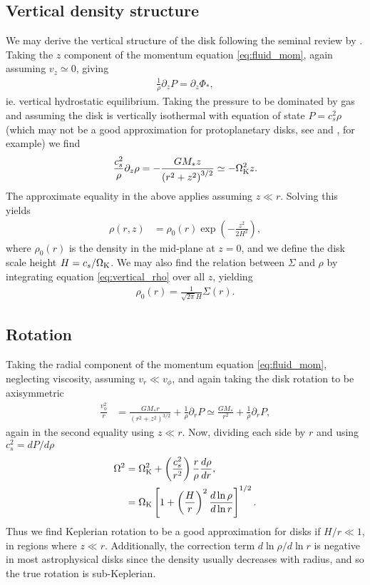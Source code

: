 \subsection{Vertical density structure}

We may derive the vertical structure of the disk following the seminal review by \citet{pringle1981}. Taking the $z$ component of the momentum equation \ref{eq:fluid_mom}, again assuming $v_z \simeq 0$, giving
\begin{align}
    \frac{1}{\rho} \partial_z P = \partial_z \Phi_*,
\end{align}
ie. vertical hydrostatic equilibrium. 
Taking the pressure to be dominated by gas and assuming the disk is vertically isothermal with equation of state $P=c_s^2 \rho$ (which may not be a good approximation for protoplanetary disks, see \citet{pinte2018} and \citet{calahan2021}, for example) we find
\begin{align}
    \frac{c_s^2}{\rho} \partial_z \rho = - \frac{G M_* z}{\left(r^2 + z^2\right)^{3/2}} \simeq - \Omega_{\rm K}^2 z.
\end{align}
The approximate equality in the above applies assuming $z \ll r$. 
Solving this yields
\begin{align}
    \rho(r,z) &= \rho_0(r) \exp{\left( -\frac{z^2}{2 H^2} \right)}, \label{eq:vertical_rho}
\end{align}
where $\rho_0(r)$ is the density in the mid-plane at $z=0$, and we define the disk scale height $H = c_s/\Omega_{\rm K}$.
We may also find the relation between $\Sigma$ and $\rho$ by integrating equation \ref{eq:vertical_rho} over all $z$, yielding
\begin{align}
    \rho_0(r) = \frac{1}{\sqrt{2\pi} H} \Sigma(r).
\end{align}

\subsection{Rotation}

Taking the radial component of the momentum equation \ref{eq:fluid_mom}, neglecting viscosity, assuming $v_r \ll v_\phi$, and again taking the disk rotation to be axisymmetric
\begin{align}
    \frac{v_\phi^2}{r} &= \frac{G M_* r}{\left( r^2 + z^2  \right)^{3/2}} + \frac{1}{\rho} \partial_r P \simeq \frac{G M_*}{ r^2} + \frac{1}{\rho} \partial_r P, 
\end{align}
again in the second equality using $z \ll r$. Now, dividing each side by $r$ and using $c_s^2=dP/d\rho$
\begin{align}
    \Omega^2 &= \Omega_{\rm K}^2 + \left( \frac{c_s^2}{r^2} \right) \frac{r}{\rho} \frac{d \rho}{dr}, \\
    &= \Omega_{\rm K} \left[ 1 + \left(\frac{H}{r}\right)^2 \frac{d \ln{\rho}}{d \ln{r}} \right]^{1/2} . \label{eq:rotation}
\end{align}
Thus we find Keplerian rotation to be a good approximation for disks if $H/r \ll 1$, in regions where $z \ll r$. Additionally, the correction term $d\ln{\rho}/d\ln{r}$ is negative in most astrophysical disks since the density usually decreases with radius, and so the true rotation is sub-Keplerian.

